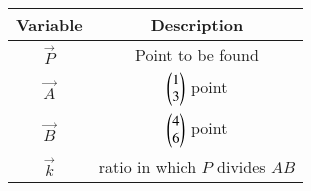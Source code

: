 \begin{tabular}[12pt]{ |c| c|}
    \hline
    \textbf{Variable} & \textbf{Description}\\ 
    \hline
	$\vec{P}$ & Point to be found\\
    \hline
	$\vec{A}$ & $\begin{pmatrix}1\\3\end{pmatrix}$ point\\
    \hline
	$\vec{B}$ & $\begin{pmatrix}4\\6\end{pmatrix}$ point\\
    \hline
	$\vec{k}$ & ratio in which $P$ divides $AB$\\
    \hline
    \end{tabular}
